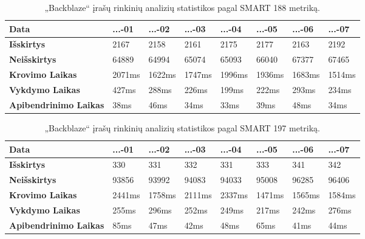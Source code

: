 \documentclass{VUMIFPSkursinis}
\begin{document}
\begin{table}[H]
\caption{„Backblaze“ įrašų rinkinių analizių statistikos pagal SMART 188 metriką.}
\label{tab:time188}
{\begin{tabular}{|l|l|l|l|l|l|l|l|}
\hline
\textbf{Data}                 & ...-01	   & ...-02     & ...-03     & ...-04 	  & ...-05     & ...-06     & ...-07     \\ \hline
\textbf{Išskirtys}            & 2167       & 2158       & 2161       & 2175       & 2177       & 2163       & 2192       \\ \hline
\textbf{Neišskirtys}          & 64889      & 64994      & 65074      & 65093      & 66040      & 67377      & 67465      \\ \hline
\textbf{Krovimo Laikas}       & 2071ms     & 1622ms     & 1747ms     & 1996ms     & 1936ms     & 1683ms     & 1514ms     \\ \hline
\textbf{Vykdymo Laikas}       & 427ms      & 288ms      & 226ms      & 199ms      & 222ms      & 293ms      & 234ms      \\ \hline
\textbf{Apibendrinimo Laikas} & 38ms       & 46ms       & 34ms       & 33ms       & 39ms       & 48ms       & 34ms       \\ \hline
\end{tabular}}
\end{table}

\begin{table}[H]
\centering
\caption{„Backblaze“ įrašų rinkinių analizių statistikos pagal SMART 197 metriką.}
\label{tab:time197}
{\begin{tabular}{|l|l|l|l|l|l|l|l|}
\hline
\textbf{Data}                 & ...-01	   & ...-02     & ...-03     & ...-04 	  & ...-05     & ...-06     & ...-07     \\ \hline
\textbf{Išskirtys}            & 330        & 331        & 332        & 331        & 333        & 341        & 342        \\ \hline
\textbf{Neišskirtys}          & 93856      & 93992      & 94083      & 94033      & 95008      & 96285      & 96406      \\ \hline
\textbf{Krovimo Laikas}       & 2441ms     & 1758ms     & 2111ms     & 2337ms     & 1471ms     & 1565ms     & 1584ms     \\ \hline
\textbf{Vykdymo Laikas}       & 255ms      & 296ms      & 252ms      & 249ms      & 217ms      & 242ms      & 276ms      \\ \hline
\textbf{Apibendrinimo Laikas} & 85ms       & 47ms       & 42ms       & 48ms       & 65ms       & 41ms       & 44ms       \\ \hline
\end{tabular}}
\end{table}
\end{document}
